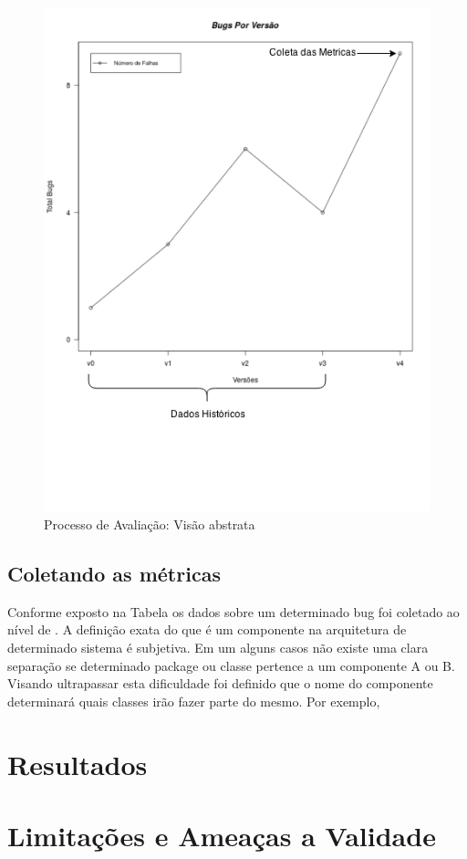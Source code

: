 \documentclass[12pt]{article}
\begin{document}
\begin{figure}[htbp]
\centering
\includegraphics[width=.80\textwidth]{./img/projeto_mes_avaliacao.png}
\caption{Processo de Avaliação: Visão abstrata}
\label{fig:avalicao}
\end{figure}

\subsection{Coletando as métricas}
\label{subsec:analise_coleta_metricas}
Conforme exposto na Tabela \label{tab:campos} os dados sobre um determinado bug
foi coletado ao nível de . A definição exata do que é um
componente na arquitetura de determinado sistema é subjetiva. Em um alguns casos
não existe uma clara separação se determinado package ou classe pertence a um
componente A ou B. Visando ultrapassar esta dificuldade foi definido que o nome
do componente determinará quais classes irão fazer parte do mesmo. Por exemplo,

\section{Resultados}
\label{sec:resultados}
\section{Limitações e Ameaças a Validade}
\label{sec:limitacoes}
\end{document}
